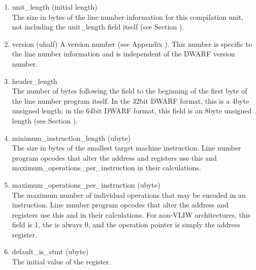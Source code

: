 \begin{enumerate}[1.]
\item unit\_length (initial length)  \\
The size in bytes of the line number information for this
compilation unit, not including the unit\_length field itself
(see Section ). 

\item version (uhalf) 
A version number 
(see Appendix ). 
This number is specific to
the line number information and is independent of the DWARF
version number. 

\item header\_length  \\
The number of bytes following the  field to the
beginning of the first byte of the line number program itself.
In the 32\dash bit DWARF format, this is a 4\dash byte unsigned
length; in the 64\dash bit DWARF format, this field is an
8\dash byte unsigned length 
(see Section ). 

\item minimum\_instruction\_length (ubyte)  \\
The size in bytes of the smallest target machine
instruction. Line number program opcodes that alter
the address and  registers use this and
maximum\-\_operations\-\_per\-\_instruction in their calculations. 

\item maximum\_operations\_per\_instruction (ubyte) \\
The 
maximum number of individual operations that may be
encoded in an instruction. Line number program opcodes
that alter the address and 
 registers use this and
in their calculations.
For non-VLIW
architectures, this field is 1, the  is always
0, and the operation pointer is simply the address register.

\item default\_is\_stmt (ubyte) \\
The initial value of the  register.  


\end{enumerate}
